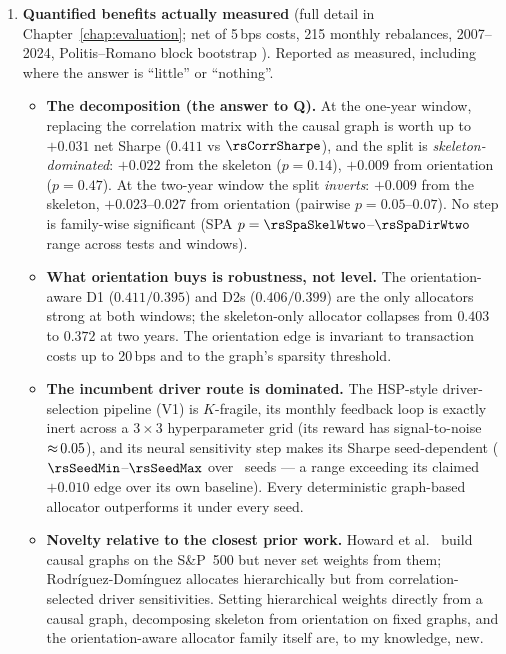 \begin{enumerate}
  \item \textbf{Quantified benefits actually measured} (full detail in
    Chapter~\ref{chap:evaluation}; net of 5\,bps costs, 215 monthly
    rebalances, 2007--2024, Politis--Romano block bootstrap
    \cite{politis1994stationary}). Reported as measured, including where the
    answer is ``little'' or ``nothing''.
  \begin{itemize}[itemsep=1pt, topsep=3pt]
    \item \textbf{The decomposition (the answer to Q).} At the one-year
      window, replacing the correlation matrix with the causal graph is worth
      up to $+0.031$ net Sharpe ($0.411$ vs $\rsCorrSharpe$), and the split is
      \emph{skeleton-dominated}: $+0.022$ from the skeleton ($p=0.14$),
      $+0.009$ from orientation ($p=0.47$). At the two-year window the split
      \emph{inverts}: $+0.009$ from the skeleton, $+0.023$--$0.027$ from
      orientation (pairwise $p=0.05$--$0.07$). No step is family-wise
      significant (SPA $p=\rsSpaSkelWtwo$--$\rsSpaDirWtwo$ range across
      tests and windows).
    \item \textbf{What orientation buys is robustness, not level.} The
      orientation-aware D1 ($0.411/0.395$) and D2s ($0.406/0.399$) are the
      only allocators strong at both windows; the skeleton-only allocator
      collapses from $0.403$ to $0.372$ at two years. The orientation edge is
      invariant to transaction costs up to 20\,bps and to the graph's
      sparsity threshold.
    \item \textbf{The incumbent driver route is dominated.} The HSP-style
      driver-selection pipeline (V1) is $K$-fragile, its monthly feedback
      loop is exactly inert across a $3{\times}3$ hyperparameter grid (its
      reward has signal-to-noise ${\approx}\,0.05$), and its neural
      sensitivity step makes its Sharpe seed-dependent
      ($\rsSeedMin$--$\rsSeedMax$ over \rsSeedN\ seeds --- a range exceeding
      its claimed $+0.010$ edge over its own baseline). Every deterministic
      graph-based allocator outperforms it under every seed.
    \item \textbf{Novelty relative to the closest prior work.} Howard et
      al.\ \cite{howard2025causal} build causal graphs on the S\&P~500 but
      never set weights from them; Rodr\'iguez-Dom\'inguez
      \cite{rodriguez2023hsp} allocates hierarchically but from correlation-
      selected driver sensitivities. Setting hierarchical weights directly
      from a causal graph, decomposing skeleton from orientation on fixed
      graphs, and the orientation-aware allocator family itself are, to my
      knowledge, new.
  \end{itemize}
\end{enumerate}


